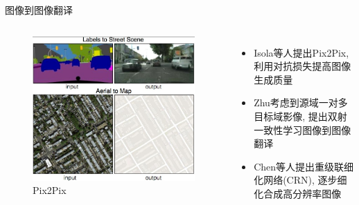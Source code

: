 \begin{frame}{图像到图像翻译}  
    \begin{columns}
        \begin{figure}
            \centering
            \includegraphics[width=\textwidth]{pic/chap0105.jpg}
            \caption{Pix2Pix}
            \label{fig:0105}
        \end{figure}

        \begin{itemize}
            \item Isola等人提出Pix2Pix, 利用对抗损失提高图像生成质量
            \item Zhu考虑到源域一对多目标域影像, 提出双射一致性学习图像到图像翻译
            \item Chen等人提出重级联细化网络(CRN), 逐步细化合成高分辨率图像
        \end{itemize}

    \end{columns}


\end{frame}

